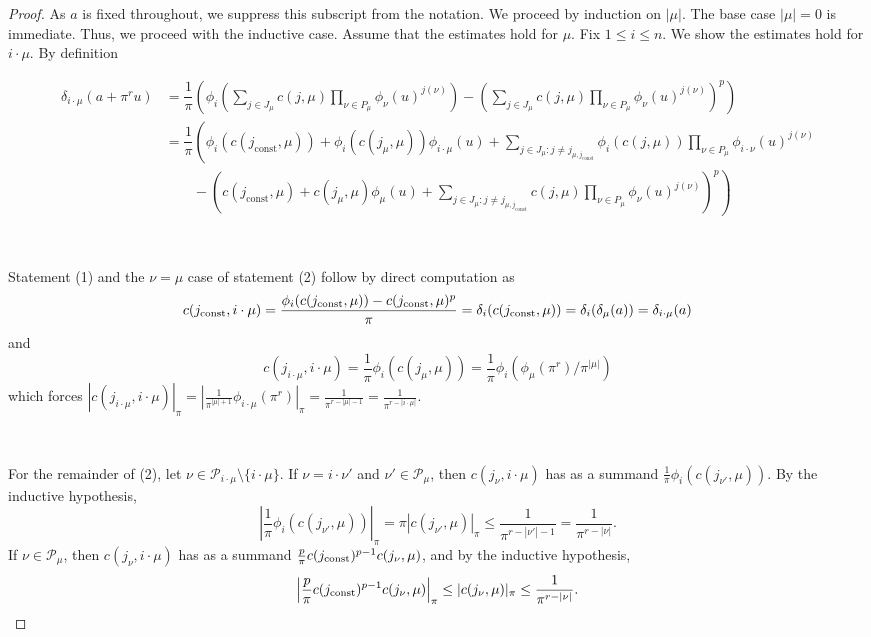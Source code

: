 \documentclass[10pt]{amsart}
\theoremstyle{Theorem}
\theoremstyle{definition}
\renewcommand{\d}{\delta}
\begin{document}
\begin{proof} As $a$ is fixed throughout, we suppress this subscript from the notation. We proceed by induction on $|\mu|$. The base case $|\mu| = 0$ is immediate. Thus, we proceed with the inductive case. Assume that the estimates hold for $\mu$. Fix $1 \leq i \leq n$. We show the estimates hold for $i \cdot \mu$. By definition

\begin{align*}
	\delta_{i\cdot \mu}(a + \pi^ru)
	&= \dfrac{1}{\pi}\left(\phi_i\left(\sum_{j\in J_\mu} c(j,\mu)\prod_{\nu\in P_\mu} \phi_\nu(u)^{j(\nu)}\right) - \left(\sum_{j\in J_\mu} c(j,\mu)\prod_{\nu\in P_\mu} \phi_\nu(u)^{j(\nu)}\right)^p\right)\\
	&=\dfrac{1}{\pi}\left(\phi_i(c(j_{\mathrm{const}},\mu)) + \phi_i(c(j_\mu,\mu))\phi_{i\cdot\mu}(u) + \sum_{j\in J_\mu\colon j\neq j_{\mu,j_{\mathrm{const}}}}\phi_i(c(j,\mu))\prod_{\nu\in P_\mu} \phi_{i\cdot\nu}(u)^{j(\nu)} \right.\\
	&\qquad - \left.\left(c(j_{\mathrm{const}},\mu) + c(j_\mu,\mu)\phi_{\mu}(u) + \sum_{j\in J_\mu\colon j\neq j_{\mu,j_{\mathrm{const}}}}c(j,\mu)\prod_{\nu\in P_\mu} \phi_{\nu}(u)^{j(\nu)}\right)^p\right)
\end{align*}

\

Statement (1) and the $\nu = \mu$ case of statement (2) follow by direct computation as 
\[c(j_{\textup{const}},i \cdot \mu) = \dfrac{\phi_i(c(j_{\mathrm{const}},\mu)) -c(j_{\mathrm{const}},\mu)^p}{\pi} = \d_i(c(j_{\mathrm{const}},\mu)) = \d_i(\d_\mu(a)) = \d_{i \cdot \mu}(a)\] and 
$$c(j_{i \cdot \mu},i \cdot \mu ) = \frac{1}{\pi}\phi_i(c(j_\mu,\mu)) =  \frac{1}{\pi} \phi_i(\phi_\mu(\pi^r)/\pi^{|\mu|})$$ which forces $|c(j_{i \cdot \mu},i \cdot \mu )|_\pi = \left| \frac{1}{\pi^{|\mu|+1}} \phi_{i \cdot \mu}(\pi^r) \right|_\pi = \frac{1}{\pi^{r - |\mu| - 1}} =\frac{1}{\pi^{r - |i \cdot \mu|}}$.
 
\

For the remainder of (2), let $\nu\in\mathcal{P}_{i\cdot \mu}\setminus \{i\cdot \mu\}$.  If $\nu =i\cdot  \nu'$ and $\nu'\in \mathcal{P}_\mu$, then $c(j_\nu,i\cdot \mu)$ has as a summand $\frac{1}{\pi}\phi_i(c(j_{\nu'}, \mu))$.  By the inductive hypothesis, 
\[\left|\frac{1}{\pi}\phi_i(c(j_{\nu'}, \mu))\right|_\pi  = \pi\left|c(j_{\nu'}, \mu)\right|_\pi\leq \frac{1}{\pi^{r-|\nu'| - 1}} = \frac{1}{\pi^{r-|\nu|}}.\]
If $\nu\in \mathcal{P}_\mu$, then $c(j_\nu,i\cdot \mu)$ has as a summand $\frac{p}{\pi}c(j_\textup{const})^{p-1}c(j_\nu,\mu)$, and by the inductive hypothesis,
\[\left|\frac{p}{\pi}c(j_\textup{const})^{p-1}c(j_\nu,\mu)\right|_\pi \leq |c(j_\nu,\mu)|_\pi \leq \frac{1}{\pi^{r-|\nu|}}.\]


\end{proof}
\end{document}
